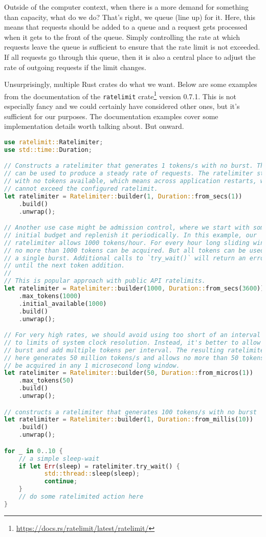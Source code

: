 Outside of the computer context, when there is a more demand for something than capacity, what do we do? That's right, we queue (line up) for it. Here, this means that requests should be added to a queue and a request gets processed when it gets to the front of the queue. Simply controlling the rate at which requests leave the queue is sufficient to ensure that the rate limit is not exceeded. If all requests go through this queue, then it is also a central place to adjust the rate of outgoing requests if the limit changes. 

Unsurprisingly, multiple Rust crates do what we want. Below are some examples from the documentation of the \texttt{ratelimit} crate\footnote{\url{https://docs.rs/ratelimit/latest/ratelimit/}} version 0.7.1. This is not especially fancy and we could certainly have considered other ones, but it's sufficient for our purposes. The documentation examples cover some implementation details worth talking about. But onward.

\begin{lstlisting}[language=Rust]
use ratelimit::Ratelimiter;
use std::time::Duration;

// Constructs a ratelimiter that generates 1 tokens/s with no burst. This
// can be used to produce a steady rate of requests. The ratelimiter starts
// with no tokens available, which means across application restarts, we
// cannot exceed the configured ratelimit.
let ratelimiter = Ratelimiter::builder(1, Duration::from_secs(1))
    .build()
    .unwrap();

// Another use case might be admission control, where we start with some
// initial budget and replenish it periodically. In this example, our
// ratelimiter allows 1000 tokens/hour. For every hour long sliding window,
// no more than 1000 tokens can be acquired. But all tokens can be used in
// a single burst. Additional calls to `try_wait()` will return an error
// until the next token addition.
//
// This is popular approach with public API ratelimits.
let ratelimiter = Ratelimiter::builder(1000, Duration::from_secs(3600))
    .max_tokens(1000)
    .initial_available(1000)
    .build()
    .unwrap();

// For very high rates, we should avoid using too short of an interval due
// to limits of system clock resolution. Instead, it's better to allow some
// burst and add multiple tokens per interval. The resulting ratelimiter
// here generates 50 million tokens/s and allows no more than 50 tokens to
// be acquired in any 1 microsecond long window.
let ratelimiter = Ratelimiter::builder(50, Duration::from_micros(1))
    .max_tokens(50)
    .build()
    .unwrap();

// constructs a ratelimiter that generates 100 tokens/s with no burst
let ratelimiter = Ratelimiter::builder(1, Duration::from_millis(10))
    .build()
    .unwrap();

for _ in 0..10 {
    // a simple sleep-wait
    if let Err(sleep) = ratelimiter.try_wait() {
           std::thread::sleep(sleep);
           continue;
    }
    // do some ratelimited action here    
}
\end{lstlisting}

